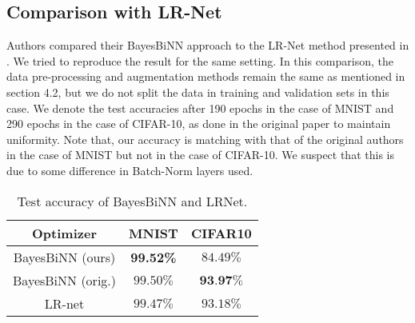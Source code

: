 \subsection{Comparison with LR-Net}
Authors compared their BayesBiNN approach to the LR-Net method presented in \citet{r8}. We tried to reproduce the result for the same setting. In this comparison, the data pre-processing and augmentation methods remain the same as mentioned in section 4.2, but we do not split the data in training and validation sets in this case. We denote the test accuracies after 190 epochs in the case of MNIST and 290 epochs in the case of CIFAR-10, as done in the original paper to maintain uniformity. Note that, our accuracy is matching with that of the original authors in the case of MNIST but not in the case of CIFAR-10. We suspect that this is due to some difference in Batch-Norm layers used.

\begin{table}[h]
\begin{center}
\renewcommand{\arraystretch}{1.1}
\begin{tabular}{ | c | c | c |}
\hline
 Optimizer & MNIST &  CIFAR10 \\ \hline
   BayesBiNN (ours) & \textbf{99.52\%} & $84.49\%$ \\ \hline
   BayesBiNN (orig.) & $99.50\%$ & $\textbf{93.97\%}$ \\ \hline
   LR-net \citet{r8} & $99.47\%$ & $93.18\%$ \\
\hline
\end{tabular}
\caption{Test accuracy of BayesBiNN and LRNet.}
\label{tab:LR_result_2}

\end{center}
\end{table}

